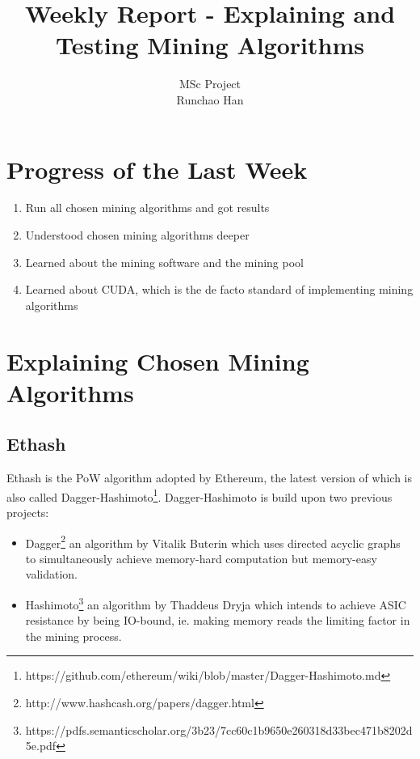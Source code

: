 \documentclass[11pt]{article}
\begin{document}
\title{Weekly Report - Explaining and Testing Mining Algorithms}
\author{MSc Project \\
Runchao Han \\
}
\maketitle
%
%

\section{Progress of the Last Week}

\begin{enumerate}
\item Run all chosen mining algorithms and got results
\item Understood chosen mining algorithms deeper
\item Learned about the mining software and the mining pool
\item Learned about CUDA, which is the de facto standard of implementing mining algorithms
\end{enumerate}

\section{Explaining Chosen Mining Algorithms}
\subsection{Ethash}

Ethash is the PoW algorithm adopted by Ethereum, the latest version of which is also called Dagger-Hashimoto\footnote{https://github.com/ethereum/wiki/blob/master/Dagger-Hashimoto.md}. Dagger-Hashimoto is build upon two previous projects:

\begin{itemize}
\item Dagger\footnote{http://www.hashcash.org/papers/dagger.html} an algorithm by Vitalik Buterin which uses directed acyclic graphs to simultaneously achieve memory-hard computation but memory-easy validation.
\item Hashimoto\footnote{https://pdfs.semanticscholar.org/3b23/7cc60c1b9650e260318d33bec471b8202d5e.pdf} an algorithm by Thaddeus Dryja which intends to achieve ASIC resistance by being IO-bound, ie. making memory reads the limiting factor in the mining process.
\end{itemize}
\end{document}
